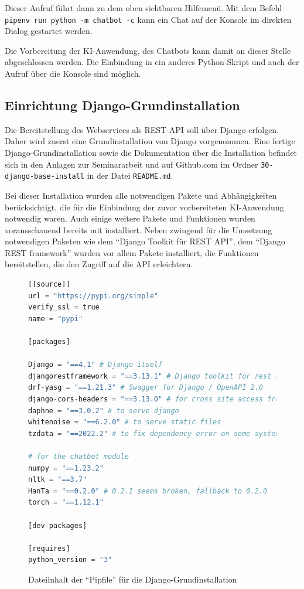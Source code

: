 \documentclass[12pt,oneside,titlepage,listof=totoc,bibliography=totoc]{scrartcl}
\newcommand{\code}[1]{\colorbox{code-gray}{\texttt{#1}}}
\begin{document}
Dieser Aufruf führt dann zu dem oben sichtbaren Hilfemenü. Mit dem Befehl \code{pipenv run python -m chatbot -c} kann ein Chat auf der Konsole im direkten Dialog gestartet werden. 

Die Vorbereitung der KI-Anwendung, des Chatbots kann damit an dieser Stelle abgeschlossen werden. Die Einbindung in ein anderes Python-Skript und auch der Aufruf über die Konsole sind möglich.
	


\subsection{Einrichtung Django-Grundinstallation}

Die Bereitstellung des Webservices als REST-API soll über Django erfolgen. Daher wird zuerst eine Grundinstallation von Django vorgenommen. Eine fertige Django-Grundinstallation sowie die Dokumentation über die Installation befindet sich in den Anlagen zur Seminararbeit und auf Github.com im Ordner \code{30-django-base-install} in der Datei \code{README.md}.

Bei dieser Installation wurden alle notwendigen Pakete und Abhängigkeiten berücksichtigt, die für die Einbindung der zuvor vorbereiteten KI-Anwendung notwendig waren. Auch einige weitere Pakete und Funktionen wurden vorausschauend bereits mit installiert. Neben zwingend für die Umsetzung notwendigen Paketen wie dem \enquote{Django Toolkit für REST API}, dem \enquote{Django REST framework} wurden vor allem Pakete installiert, die Funktionen bereitstellen, die den Zugriff auf die API erleichtern. 


\begin{figure}[H]
	\caption{Dateiinhalt der \enquote{Pipfile} für die Django-Grundinstallation}
	\label{fig:code-nn-basis}
\begin{lstlisting}[language=python]
[[source]]
url = "https://pypi.org/simple"
verify_ssl = true
name = "pypi"

[packages]

Django = "==4.1" # Django itself 
djangorestframework = "==3.13.1" # Django toolkit for rest api
drf-yasg = "==1.21.3" # Swagger for Django / OpenAPI 2.0 
django-cors-headers = "==3.13.0" # for cross site access from a frontend
daphne = "==3.0.2" # to serve django 
whitenoise = "==6.2.0" # to serve static files
tzdata = "==2022.2" # to fix dependency error on some systems

# for the chatbot module
numpy = "==1.23.2" 
nltk = "==3.7"
HanTa = "==0.2.0" # 0.2.1 seems broken, fallback to 0.2.0
torch = "==1.12.1"

[dev-packages]

[requires]
python_version = "3"
\end{lstlisting}
\end{figure}
\end{document}
